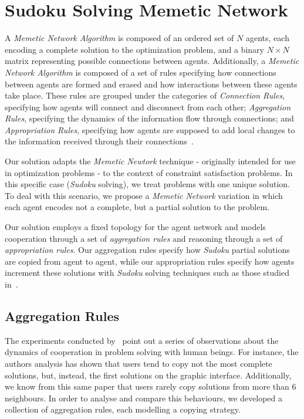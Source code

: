 \documentclass{article}
\begin{document}
\section{Sudoku Solving Memetic Network}
 
A {\em Memetic Network Algorithm} is composed of an ordered set of $N$ agents, each encoding a complete solution to the optimization problem, and a binary $N \times N$ matrix representing possible connections between agents. Additionally, a {\em Memetic Network Algorithm} is composed of a set of rules specifying how connections between agents are formed and erased and how interactions between these agents take place. These rules are grouped under the categories of {\em Connection Rules}, specifying how agents will connect and disconnect from each other; {\em Aggregation Rules}, specifying the dynamics of the information flow through connections; and {\em Appropriation Rules}, specifying how agents are supposed to add local changes to the information received through their connections~\cite{lamb:memenet}.

Our solution adapts the {\em Memetic Newtork} technique - originally intended for use in optimization problems - to the context of constraint satisfaction problems. In this specific case ({\em Sudoku} solving), we treat problems with one unique solution. To deal with this scenario, we propose a {\em Memetic Network} variation in which each agent encodes not a complete, but a partial solution to the problem.

Our solution employs a fixed topology for the agent network and models cooperation through a set of {\em aggregation rules} and reasoning through a set of {\em appropriation rules}. Our aggregation rules specify how {\em Sudoku} partial solutions are copied from agent to agent, while our appropriation rules specify how agents increment these solutions with {\em Sudoku} solving techniques such as those studied in~\cite{davis:mathsudoku}.

\subsection{Aggregation Rules}

The experiments conducted by~\cite{farenzena:collabem} point out a series of observations about the dynamics of cooperation in problem solving with human beings. For instance, the authors analysis has shown that users tend to copy not the most complete solutions, but, instead, the first solutions on the graphic interface. Additionally, we know from this same paper that users rarely copy solutions from more than 6 neighbours. In order to analyse and compare this behaviours, we developed a collection of aggregation rules, each modelling a copying strategy.
\end{document}
